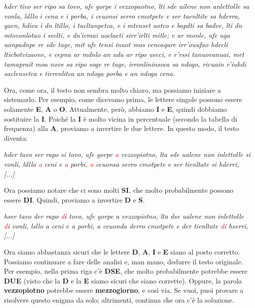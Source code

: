 \documentclass{report}
\begin{document}
\vspace{0.2cm}

\textit{hder tivo ser ripo sa tovo, ufe gorpe i vezzopaotno, lti sde uilene non anlettolle
sa vonla, ldllo i cena e i porba, i ceuonsi serro cmotpete e ser taenltite sa hderra,
gaen, hdica i dn ltillo, i tacltanpetca, e i mtenset uotco e bapdti sa badve, lti dn
mtovonlotao i seclti, e dn’ivmai uoclaeti sirr’irlti mitle; e ar monle, ufe aga uonpadnpe
re sde tage, mit ufe tensi inuot mas cencaqare irr’ouufao hdecli lticbotvizaone, e cepna
ar mdnlo an uda ar ripo uecci, e r’rssi tanuovanuai, met tamaprait moa nove sa ripo soge
re tage, irronlininsoca sa ndogo, ricuain r’iuhdi saclensetca e tirrenlitca an ndoga
porba e an ndoga cena.}
\vspace{0.2cm}

Ora, come ora, il testo non sembra molto chiaro, ma possiamo iniziare a sistemarlo.  
Per esempio, come dicevamo prima, le lettere singole possono essere solamente \textbf{E}, \textbf{A} o \textbf{O}.  
Attualmente, però, abbiamo \textbf{I} e \textbf{E}, quindi dobbiamo sostituire la \textbf{I}.  
Poiché la \textbf{I} è molto vicina in percentuale (secondo la tabella di frequenza) alla \textbf{A}, proviamo a invertire le due lettere.  
In questo modo, il testo diventa:

\vspace{0.2cm}
\textit{hder tavo ser rapo si tovo, ufe gorpe \textcolor{red}{a} vezzopiotno, lta sde ualene non inlettolle
si vonli, ldllo \textcolor{red}{a} ceni e \textcolor{red}{a} porbi, \textcolor{red}{a} ceuonsa serro cmotpete e ser tienltate si hderri, [...]}
\vspace{0.2cm}

Ora possiamo notare che ci sono molti \textbf{SI}, che molto probabilmente possono essere \textbf{DI}.  
Quindi, proviamo a invertire \textbf{D} e \textbf{S}.

\vspace{0.2cm}
\textit{hser tavo der rapo \textcolor{red}{d}i tovo, ufe gorpe a vezzopiotno, lta dse ualene non inlettolle
\textcolor{red}{d}i vonli, lsllo a ceni e a porbi, a ceuonda derro cmotpete e der tienltate \textcolor{red}{d}i hserri, [...]}\vspace{0.2cm}

Ora siamo abbastanza sicuri che le lettere \textbf{D}, \textbf{A}, \textbf{I} e \textbf{E} siano al posto corretto.  
Possiamo continuare a fare delle analisi e, man mano, dedurre il testo originale.  
Per esempio, nella prima riga c'è \textbf{DSE}, che molto probabilmente potrebbe essere \textbf{DUE} (visto che la \textbf{D} e la \textbf{E} siamo sicuri che siano corrette).  
Oppure, la parola \textbf{vezzopiotno} potrebbe essere \textbf{mezzogiorno}, e così via.  
Se vuoi, puoi provare a risolvere questo enigma da solo; altrimenti, continua che ora c'è la soluzione.
\end{document}
